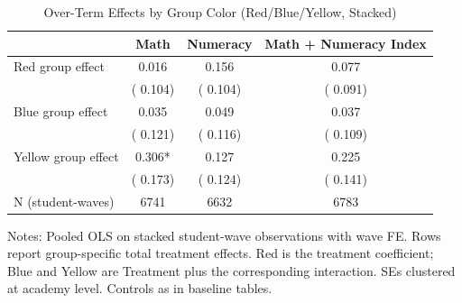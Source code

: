 \begin{table}[!htbp]
\centering
\caption{Over-Term Effects by Group Color (Red/Blue/Yellow, Stacked)}
\label{tab:ng_over_terms_interact}
\begin{threeparttable}
\begin{tabular}[t]{lccc}
\toprule
 & Math & Numeracy & Math + Numeracy Index \\
\midrule
Red group effect &   0.016 &   0.156 &   0.077 \\
 & (  0.104) & (  0.104) & (  0.091) \\
Blue group effect &   0.035 &   0.049 &   0.037 \\
 & (  0.121) & (  0.116) & (  0.109) \\
Yellow group effect &   0.306* &   0.127 &   0.225 \\
 & (  0.173) & (  0.124) & (  0.141) \\
\addlinespace
N (student-waves) & 6741 & 6632 & 6783 \\
\bottomrule
\end{tabular}
\begin{tablenotes}[para]
\item Notes: Pooled OLS on stacked student-wave observations with wave FE. Rows report group-specific total treatment effects. 
Red is the treatment coefficient; Blue and Yellow are Treatment plus the corresponding interaction. SEs clustered at academy level. Controls as in baseline tables.
\end{tablenotes}
\end{threeparttable}
\end{table}
